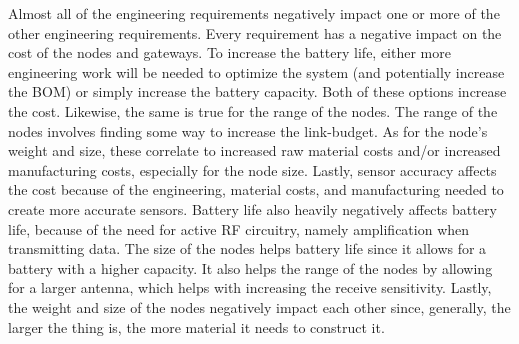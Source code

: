 Almost all of the engineering requirements negatively impact one or more of the
other engineering requirements. Every requirement has a negative impact on the
cost of the nodes and gateways. To increase the battery life, either more
engineering work will be needed to optimize the system (and potentially increase
the BOM) or simply increase the battery capacity. Both of these options increase
the cost.  Likewise, the same is true for the range of the nodes. The range of
the nodes involves finding some way to increase the link-budget. As for the
node's weight and size, these correlate to increased raw material costs and/or
increased manufacturing costs, especially for the node size. Lastly, sensor
accuracy affects the cost because of the engineering, material costs, and
manufacturing needed to create more accurate sensors. Battery life also heavily
negatively affects battery life, because of the need for active RF circuitry,
namely amplification when transmitting data. The size of the nodes helps battery
life since it allows for a battery with a higher capacity. It also helps the
range of the nodes by allowing for a larger antenna, which helps with increasing
the receive sensitivity. Lastly, the weight and size of the nodes negatively
impact each other since, generally, the larger the thing is, the more material
it needs to construct it.


